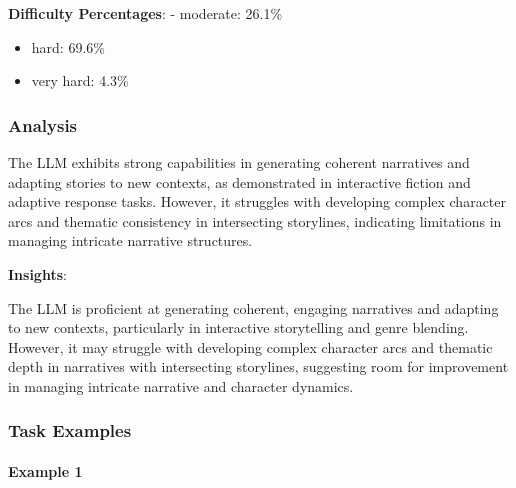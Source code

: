 \documentclass[fleqn,10pt]{wlscirep}
\begin{document}
\textbf{Difficulty Percentages}: - moderate: 26.1\%

\begin{itemize}
\item
  hard: 69.6\%
\item
  very hard: 4.3\%
\end{itemize}

\hypertarget{analysis-11}{%
\subsubsection{Analysis}\label{analysis-11}}

The LLM exhibits strong capabilities in generating coherent narratives
and adapting stories to new contexts, as demonstrated in interactive
fiction and adaptive response tasks. However, it struggles with
developing complex character arcs and thematic consistency in
intersecting storylines, indicating limitations in managing intricate
narrative structures.

\textbf{Insights}:

The LLM is proficient at generating coherent, engaging narratives and
adapting to new contexts, particularly in interactive storytelling and
genre blending. However, it may struggle with developing complex
character arcs and thematic depth in narratives with intersecting
storylines, suggesting room for improvement in managing intricate
narrative and character dynamics.

\hypertarget{task-examples-11}{%
\subsubsection{Task Examples}\label{task-examples-11}}

\hypertarget{example-1-11}{%
\paragraph{Example 1}\label{example-1-11}}
\end{document}
